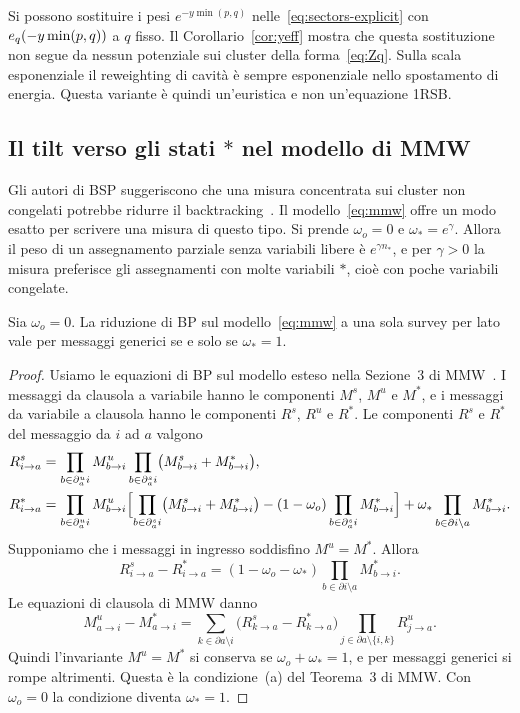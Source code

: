 \begin{osservazione}
Si possono sostituire i pesi $e^{-y\min(p,q)}$ nelle~\eqref{eq:sectors-explicit} con $e_q(-y\min(p,q))$ a $q$ fisso.
Il Corollario~\ref{cor:yeff} mostra che questa sostituzione non segue da nessun potenziale sui cluster della forma~\eqref{eq:Zq}.
Sulla scala esponenziale il reweighting di cavità è sempre esponenziale nello spostamento di energia.
Questa variante è quindi un'euristica e non un'equazione 1RSB.
\end{osservazione}

\subsection{Il tilt verso gli stati $*$ nel modello di MMW}

Gli autori di BSP suggeriscono che una misura concentrata sui cluster non congelati potrebbe ridurre il backtracking~\citep{marino2016bsp}.
Il modello~\eqref{eq:mmw} offre un modo esatto per scrivere una misura di questo tipo.
Si prende $\omega_o=0$ e $\omega_*=e^{\gamma}$.
Allora il peso di un assegnamento parziale senza variabili libere è $e^{\gamma n_*}$, e per $\gamma>0$ la misura preferisce gli assegnamenti con molte variabili $*$, cioè con poche variabili congelate.

\begin{proposizione}
\label{prop:gamma}
Sia $\omega_o=0$.
La riduzione di BP sul modello~\eqref{eq:mmw} a una sola survey per lato vale per messaggi generici se e solo se $\omega_*=1$.
\end{proposizione}

\begin{proof}
Usiamo le equazioni di BP sul modello esteso nella Sezione~3 di MMW~\citep{maneva2007survey}.
I messaggi da clausola a variabile hanno le componenti $M^s$, $M^u$ e $M^*$, e i messaggi da variabile a clausola hanno le componenti $R^s$, $R^u$ e $R^*$.
Le componenti $R^s$ e $R^*$ del messaggio da $i$ ad $a$ valgono
\begin{align*}
R^s_{i\to a}&=\prod_{b\in\partial^{u}_{a} i}M^u_{b\to i}\prod_{b\in\partial^{s}_{a} i}\bigl(M^s_{b\to i}+M^*_{b\to i}\bigr),\\
R^*_{i\to a}&=\prod_{b\in\partial^{u}_{a} i}M^u_{b\to i}\Bigl[\prod_{b\in\partial^{s}_{a} i}\bigl(M^s_{b\to i}+M^*_{b\to i}\bigr)-(1-\omega_o)\prod_{b\in\partial^{s}_{a} i}M^*_{b\to i}\Bigr]+\omega_*\prod_{b\in\partial i\setminus a}M^*_{b\to i}.
\end{align*}
Supponiamo che i messaggi in ingresso soddisfino $M^u=M^*$.
Allora
\begin{equation*}
R^s_{i\to a}-R^*_{i\to a}=(1-\omega_o-\omega_*)\prod_{b\in\partial i\setminus a}M^*_{b\to i}.
\end{equation*}
Le equazioni di clausola di MMW danno
\begin{equation*}
M^u_{a\to i}-M^*_{a\to i}=\sum_{k\in\partial a\setminus i}\bigl(R^s_{k\to a}-R^*_{k\to a}\bigr)\prod_{j\in\partial a\setminus\{i,k\}}R^u_{j\to a}.
\end{equation*}
Quindi l'invariante $M^u=M^*$ si conserva se $\omega_o+\omega_*=1$, e per messaggi generici si rompe altrimenti.
Questa è la condizione~(a) del Teorema~3 di MMW.
Con $\omega_o=0$ la condizione diventa $\omega_*=1$.
\end{proof}


